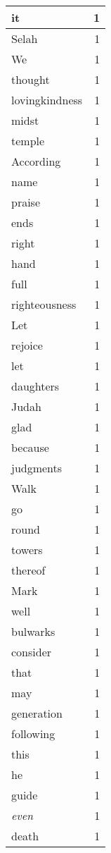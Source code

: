 \begin{center}
\begin{longtable}{l|r}
it & 1 \\ \hline
Selah & 1 \\ \hline
We & 1 \\ \hline
thought & 1 \\ \hline
lovingkindness & 1 \\ \hline
midst & 1 \\ \hline
temple & 1 \\ \hline
According & 1 \\ \hline
name & 1 \\ \hline
praise & 1 \\ \hline
ends & 1 \\ \hline
right & 1 \\ \hline
hand & 1 \\ \hline
full & 1 \\ \hline
righteousness & 1 \\ \hline
Let & 1 \\ \hline
rejoice & 1 \\ \hline
let & 1 \\ \hline
daughters & 1 \\ \hline
Judah & 1 \\ \hline
glad & 1 \\ \hline
because & 1 \\ \hline
judgments & 1 \\ \hline
Walk & 1 \\ \hline
go & 1 \\ \hline
round & 1 \\ \hline
towers & 1 \\ \hline
thereof & 1 \\ \hline
Mark & 1 \\ \hline
well & 1 \\ \hline
bulwarks & 1 \\ \hline
consider & 1 \\ \hline
that & 1 \\ \hline
may & 1 \\ \hline
generation & 1 \\ \hline
following & 1 \\ \hline
this & 1 \\ \hline
he & 1 \\ \hline
guide & 1 \\ \hline
\emph{even} & 1 \\ \hline
death & 1 \\ \hline
\end{longtable}
\end{center}



